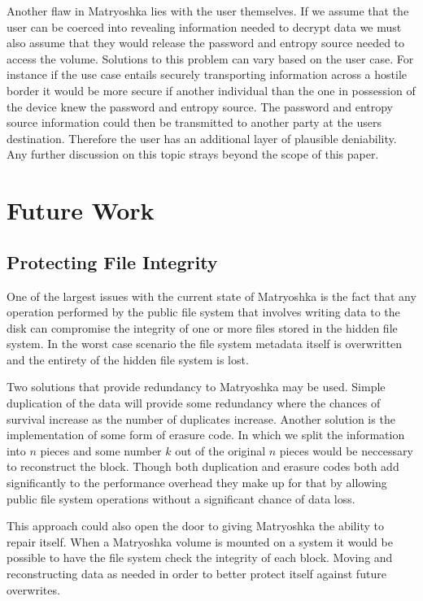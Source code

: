 \documentclass{article}
\begin{document}
\begin{multicols}{2}
Another flaw in Matryoshka lies with the user themselves. If we assume that the user can be coerced into revealing information needed to decrypt data we must also assume that they would release the password and entropy source needed to access the volume. Solutions to this problem can vary based on the user case. For instance if the use case entails securely transporting information across a hostile border it would be more secure if another individual than the one in possession of the device knew the password and entropy source. The password and entropy source information could then be transmitted to another party at the users destination. Therefore the user has an additional layer of plausible deniability. Any further discussion on this topic strays beyond the scope of this paper.

\section{Future Work}

\subsection{Protecting File Integrity}
One of the largest issues with the current state of Matryoshka is the fact that any operation performed by the public file system that involves writing data to the disk can compromise the integrity of one or more files stored in the hidden file system. In the worst case scenario the file system metadata itself is overwritten and the entirety of the hidden file system is lost.

Two solutions that provide redundancy to Matryoshka may be used. Simple duplication of the data will provide some redundancy where the chances of survival increase as the number of duplicates increase. Another solution is the implementation of some form of erasure code. In which we split the information into $n$ pieces and some number $k$ out of the original $n$ pieces would be neccessary to reconstruct the block. Though both duplication and erasure codes both add significantly to the performance overhead they make up for that by allowing public file system operations without a significant chance of data loss. 

This approach could also open the door to giving Matryoshka the ability to repair itself. When a Matryoshka volume is mounted on a system it would be possible to have the file system check the integrity of each block. Moving and reconstructing data as needed in order to better protect itself against future overwrites. 


\end{multicols}
\end{document}
